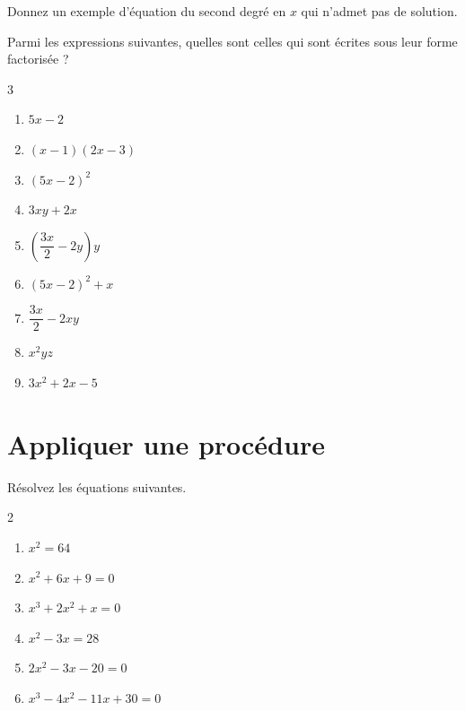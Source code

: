 \documentclass[a4paper, 12pt, parskip=half-, twoside=semi]{scrartcl}
\begin{document}
\begin{connaitre}[points=1]
    Donnez un exemple d'équation du second degré en $x$ qui n'admet pas de solution.
\end{connaitre}

\begin{connaitre}[points=2]
    Parmi les expressions suivantes, quelles sont celles qui sont écrites sous leur forme factorisée ?
    \begin{multicols}{3}
        \begin{enumerate}
            \item \(5x-2\)
            \item \((x-1)(2x-3)\)
            \item \((5x-2)^2\)
            \item \(3xy+2x\)
            \item \(\left(\dfrac{3x}{2}-2y\right)y\)
            \item \((5x-2)^2+x\)
            \item \(\dfrac{3x}{2}-2xy\)
            \item \(x^2yz\)
            \item \(3x^2+2x-5\)
        \end{enumerate}
    \end{multicols}
\end{connaitre}

\section*{ Appliquer une procédure}
\begin{appliquer}[points=11]
    Résolvez les équations suivantes.
    \begin{multicols}{2}
        \begin{enumerate}
            \item \(x^2 = 64\) %
            \item \(x^2 + 6x + 9 = 0\) %
            \item \(x^3 + 2 x^2 + x = 0\) %
            \item \(x^2 -3x = 28 \) %
            \item \(2x^2-3x-20=0\) %
            \item \(x^3 - 4x^2 - 11x + 30 = 0\) %
        \end{enumerate}
    \end{multicols}
\end{appliquer}
\end{document}
